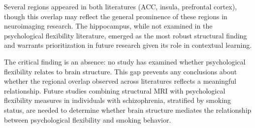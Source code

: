 \documentclass[12pt]{article}
\begin{document}
Several regions appeared in both literatures (ACC, insula, prefrontal cortex), though this overlap may reflect the general prominence of these regions in neuroimaging research. The hippocampus, while not examined in the psychological flexibility literature, emerged as the most robust structural finding and warrants prioritization in future research given its role in contextual learning.

The critical finding is an absence: no study has examined whether psychological flexibility relates to brain structure. This gap prevents any conclusions about whether the regional overlap observed across literatures reflects a meaningful relationship. Future studies combining structural MRI with psychological flexibility measures in individuals with schizophrenia, stratified by smoking status, are needed to determine whether brain structure mediates the relationship between psychological flexibility and smoking behavior.



\end{document}
